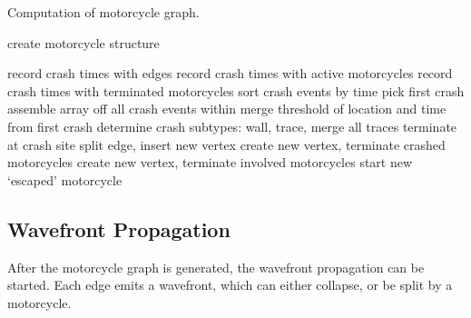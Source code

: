 \documentclass[12pt,a4paper,oneside,openany]{article}
\begin{document}
\begin{algorithm}
\caption{Computation of motorcycle graph.}
\label{alg:mc}
\begin{algorithmic}
	\State create motorcycle structure
\EndFor

\Repeat
		\State record crash times with edges
		\State record crash times with active motorcycles
		\State record crash times with terminated motorcycles
	\EndFor
	\State sort crash events by time
	\State pick first crash
	\State assemble array off all crash events within merge threshold of location and time from first crash
	\State determine crash subtypes: wall, trace, merge
		\State all traces terminate at crash site
			\State split edge, insert new vertex
		\EndIf
		\State create new vertex, terminate crashed motorcycles
	\Else
		\State create new vertex, terminate involved motorcycles
			\State start new `escaped' motorcycle
		\EndIf
	\EndIf 

\end{algorithmic}
\end{algorithm}

\subsection{Wavefront Propagation}

After the motorcycle graph is generated, the wavefront propagation can be started. Each edge emits a wavefront, which can either collapse, or be split by a motorcycle.
\end{document}
